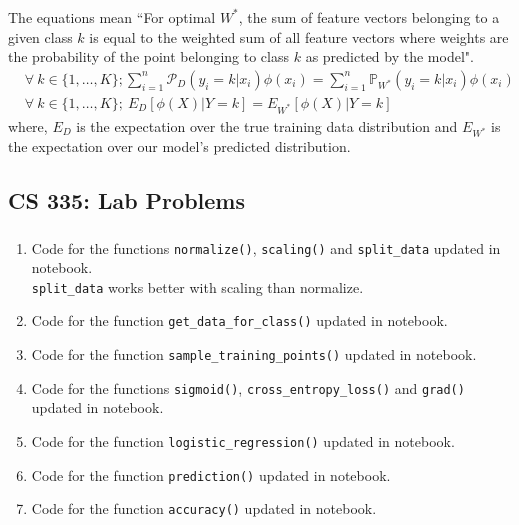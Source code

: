\documentclass[12pt, fleqn]{article}
\begin{document}
\subsubsection{}
The equations mean ``For optimal $W^*$, the sum of feature vectors belonging to a given class $k$ is equal to the weighted sum of all feature vectors where weights are the probability of the point belonging to class $k$ as predicted by the model".
\begin{equation*}
  \begin{aligned}
     & \forall \ k \in \{1, \dots, K\}; \sum_{i=1}^n \mathcal{P}_D (y_i = k | x_i) \phi(x_i) = \sum_{i=1}^n \mathbb{P}_{W^*} (y_i = k | x_i) \phi(x_i) \\
     & \forall \ k \in \{1, \dots, K\}; \ E_D [\phi(X) | Y = k] = E_{W^*} [\phi(X) | Y = k]
  \end{aligned}
\end{equation*}
where, $E_D$ is the expectation over the true training data distribution and $E_{W^*}$ is the expectation over our model’s predicted distribution.


\newpage
\subsection{CS 335: Lab Problems}
\subsubsection{}
\begin{enumerate}[label=(\roman*)]
  \item Code for the functions \verb!normalize()!, \verb!scaling()! and \verb!split_data! updated in notebook. \\
        \verb!split_data! works better with scaling than normalize.
  \item Code for the function \verb!get_data_for_class()! updated in notebook.
  \item Code for the function \verb!sample_training_points()! updated in notebook.
  \item Code for the functions \verb!sigmoid()!, \verb!cross_entropy_loss()! and \verb!grad()! updated in notebook.
  \item Code for the function \verb!logistic_regression()! updated in notebook.
  \item Code for the function \verb!prediction()! updated in notebook.
  \item Code for the function \verb!accuracy()! updated in notebook.
\end{enumerate}
\end{document}
